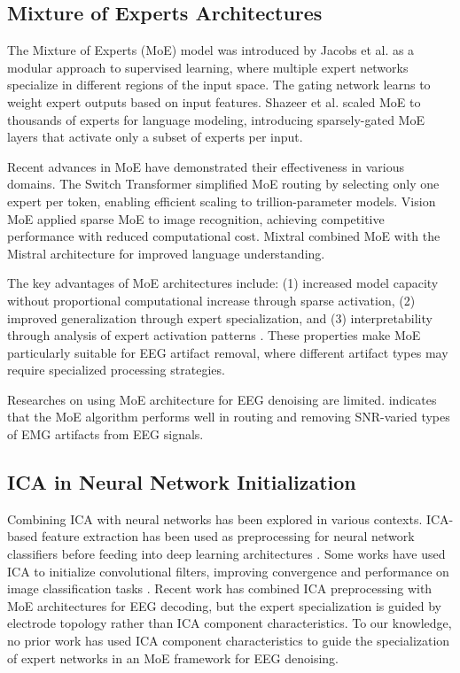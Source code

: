 \documentclass{article}
\begin{document}
\subsection{Mixture of Experts Architectures}

The Mixture of Experts (MoE) model was introduced by Jacobs et al. \cite{jacobs1991adaptive} as a modular approach to supervised learning, where multiple expert networks specialize in different regions of the input space. The gating network learns to weight expert outputs based on input features. Shazeer et al. \cite{shazeer2017outrageously} scaled MoE to thousands of experts for language modeling, introducing sparsely-gated MoE layers that activate only a subset of experts per input.

Recent advances in MoE have demonstrated their effectiveness in various domains. The Switch Transformer \cite{fedus2022switch} simplified MoE routing by selecting only one expert per token, enabling efficient scaling to trillion-parameter models. Vision MoE \cite{riquelme2021scaling} applied sparse MoE to image recognition, achieving competitive performance with reduced computational cost. Mixtral \cite{jiang2024mixtral} combined MoE with the Mistral architecture for improved language understanding.

The key advantages of MoE architectures include: (1) increased model capacity without proportional computational increase through sparse activation, (2) improved generalization through expert specialization, and (3) interpretability through analysis of expert activation patterns \cite{chen2023mixture}. These properties make MoE particularly suitable for EEG artifact removal, where different artifact types may require specialized processing strategies.

Researches on using MoE architecture for EEG denoising are limited. \cite{choi2025moeemg} indicates that the MoE algorithm performs well in routing and removing SNR-varied types of EMG artifacts from EEG signals. 

\subsection{ICA in Neural Network Initialization}

Combining ICA with neural networks has been explored in various contexts. ICA-based feature extraction has been used as preprocessing for neural network classifiers before feeding into deep learning architectures \cite{makeig2004mining} \cite{vw2023} \cite{sutharsan2022}. Some works have used ICA to initialize convolutional filters, improving convergence and performance on image classification tasks \cite{le2011ica}. Recent work \cite{gcmcg2025} has combined ICA preprocessing with MoE architectures for EEG decoding, but the expert specialization is guided by electrode topology rather than ICA component characteristics. To our knowledge, no prior work has used ICA component characteristics to guide the specialization of expert networks in an MoE framework for EEG denoising.
\end{document}
